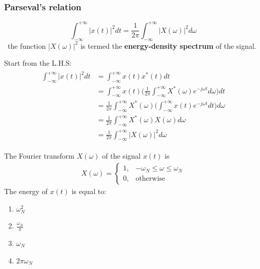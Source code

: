 \subsubsection{Parseval's relation}
\[ 
    \int_{-\infty}^{+\infty} \lvert x(t) \rvert^{2} dt = \frac{1}{2\pi} \int_{-\infty}^{+\infty} \lvert X(\omega) \rvert^{2} d\omega 
\]
\ the function $\lvert X(\omega) \rvert^{2}$ is termed the \textbf{energy-density spectrum} of the signal.
\begin{dv}{}
    Start from the L.H.S:
    \begin{align*} \begin{split}
     \int_{-\infty}^{+\infty} \lvert x(t) \rvert^{2} dt &= \int_{-\infty}^{+\infty} x(t) x^{*}(t) dt \\
    &= \int_{-\infty}^{+\infty} x(t) \bigg( \frac{1}{2\pi} \int_{-\infty}^{+\infty} X^{*}(\omega) e^{-j\omega t} d\omega \bigg) dt\\
    &= \frac{1}{2\pi} \int_{-\infty}^{+\infty} X^{*}(\omega)\bigg( \int_{-\infty}^{+\infty} x(t) e^{-j\omega t} dt \bigg) d\omega \\
    &= \frac{1}{2\pi} \int_{-\infty}^{+\infty} X^{*}(\omega)X(\omega) d\omega \\
    & = \frac{1}{2\pi} \int_{-\infty}^{+\infty}  \lvert X(\omega) \rvert^{2} d\omega 
    \end{split} \end{align*}
\end{dv}

\begin{q}{}
The Fourier transform $X(\omega)$ of the signal $x(t)$ is
\begin{align*}
    X(\omega) =
    \begin{cases}
    1, & -\omega_{N} \leq \omega \leq \omega_{N} \\
    0, & \text{otherwise}
    \end{cases}
\end{align*}
The energy of $x(t)$ is equal to:
\begin{multicols}{2}
\begin{enumerate}[label=(\alph*)]
    \item $\omega_{N}^{2}$
    \item $\frac{\omega_{N}}{\pi}$
    \item $\omega_{N}$
    \item $2\pi\omega_{N}$
\end{enumerate}
\end{multicols}
\end{q}

